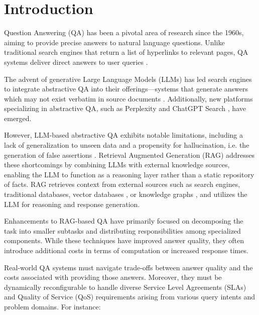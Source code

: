 \documentclass[sigconf,nonacm]{acmart}
\begin{document}




\maketitle
\section{Introduction}
Question Answering (QA) has been a pivotal area of research since the 1960s, aiming to provide precise answers to natural language questions. Unlike traditional search engines that return a list of hyperlinks to relevant pages, QA systems deliver direct answers to user queries \cite{zhu-qa}.

The advent of generative Large Language Models (LLMs) has led search engines to integrate abstractive QA into their offerings—systems that generate answers which may not exist verbatim in source documents \cite{AIPowered_2024}. Additionally, new platforms specializing in abstractive QA, such as Perplexity \cite{perplexity-rag} and ChatGPT Search \cite{chatgpt-search}, have emerged.

However, LLM-based abstractive QA exhibits notable limitations, including a lack of generalization to unseen data and a propensity for hallucination, i.e. the generation of false assertions \cite{survey_hallucination}.  Retrieval Augmented Generation (RAG) \cite{gao2024ragllm} addresses these shortcomings by combining LLMs with external knowledge sources, enabling the LLM to function as a reasoning layer rather than a static repository of facts. RAG retrieves context from external sources such as search engines, traditional databases, vector databases \cite{jing2024llm-vector}, or knowledge graphs \cite{knowledge-injection, xu-rag-customer}, and utilizes the LLM for reasoning and response generation.

Enhancements to RAG-based QA have primarily focused on decomposing the task into smaller subtasks and distributing responsibilities among specialized components. While these techniques have improved answer quality, they often introduce additional costs in terms of computation or increased response times.
    
Real-world QA systems must navigate trade-offs between answer quality and the costs associated with providing those answers. Moreover, they must be dynamically reconfigurable to handle diverse Service Level Agreements (SLAs) and Quality of Service (QoS) requirements arising from various query intents and problem domains. For instance:
\end{document}
